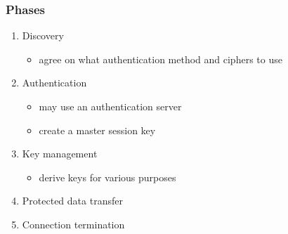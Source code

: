 \documentclass[final]{article}
\begin{document}
\subsubsection*{Phases}
\begin{enumerate}[nosep]
    \item Discovery
          \begin{itemize}
              \item agree on what authentication method and ciphers to use
          \end{itemize}
    \item Authentication
          \begin{itemize}[nosep]
              \item may use an authentication server
              \item create a master session key
          \end{itemize}
    \item Key management
          \begin{itemize}[nosep]
              \item derive keys for various purposes
          \end{itemize}
    \item Protected data transfer
    \item Connection termination
\end{enumerate}
\end{document}
